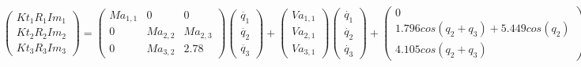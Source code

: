 \[
	\begin{pmatrix}
	Kt_{1}R_{1}Im_{1} \\
	Kt_{2}R_{2}Im_{2} \\
	Kt_{3}R_{3}Im_{3}
	\end{pmatrix} =
	\begin{pmatrix}
	Ma_{1,1} & 0 & 0 \\
	0 & Ma_{2,2} & Ma_{2,3}\\
	0 & Ma_{3,2} & 2.78
	\end{pmatrix}
	\begin{pmatrix}
	\ddot{q_{1}} \\
	\ddot{q_{2}}  \\
	\ddot{q_{3}}
\end{pmatrix} +
\begin{pmatrix}
	Va_{1,1}\\
	Va_{2,1} \\
  Va_{3,1}
\end{pmatrix}
\begin{pmatrix}
		\dot{q_{1}} \\
		\dot{q_{2}}  \\
		\dot{q_{3}}
\end{pmatrix} +
\begin{pmatrix}
	0																	\\
1.796cos(q_2 + q_3) + 5.449cos(q_2) \\
4.105cos(q_2 + q_3)
\end{pmatrix}
\]

